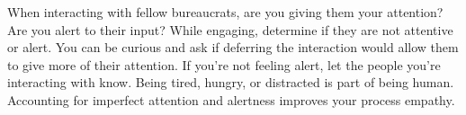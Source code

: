 When interacting with fellow bureaucrats, are you giving them your attention? Are you alert to their input? While engaging, determine if they are not attentive or alert. You can be curious and ask if deferring the interaction would allow them to give more of their attention. If you're not feeling alert, let the people you're interacting with know. Being tired, hungry, or distracted is part of being human. Accounting for imperfect attention and alertness improves your process empathy.


